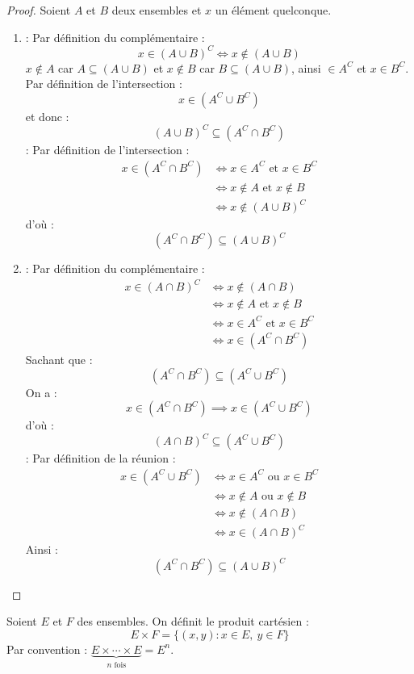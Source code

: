 \begin{proof}
	Soient $A$ et $B$ deux ensembles et $x$ un élément quelconque. 
	\begin{enumerate}
		\item \boxed{\subseteq} : Par définition du complémentaire :
		\[ x \in (A \cup B)^C \iff x \notin (A \cup B) \]
		$x \notin A$ car $A \subseteq (A \cup B)$ et $x \notin B$ car $B \subseteq (A \cup B)$, ainsi $ \in A^C$ et $x \in B^C$. 
		\\
		Par définition de l'intersection :
		\[ x \in (A^C \cup B^C) \]
		et donc :
		\[ (A \cup B)^C \subseteq (A^C \cap B^C) \]
		\boxed{\supseteq} : Par définition de l'intersection :
		\begin{align*}
			x \in (A^C \cap B^C) &\iff x \in A^C \text{ et } x \in B^C \\
			&\iff x \notin A \text{ et } x \notin B \\
			&\iff x \notin (A \cup B)^C
		\end{align*}
		d'où :
		\[ (A^C \cap B^C) \subseteq (A \cup B)^C \]
		\item \boxed{\subseteq} : Par définition du complémentaire :
		\begin{align*}
			x \in (A \cap B)^C &\iff x \notin (A \cap B) \\
			&\iff x \notin A \text{ et } x \notin B \\
			&\iff x \in A^C \text{ et } x \in B^C \\
			&\iff x \in (A^C \cap B^C)
		\end{align*}
		Sachant que :
		\[ (A^C \cap B^C) \subseteq (A^C \cup B^C) \]
		On a :
		\[ x \in (A^C \cap B^C) \implies x \in (A^C \cup B^C) \]
		d'où :
		\[ (A \cap B)^C \subseteq (A^C \cup B^C) \]
		\boxed{\supseteq} : Par définition de la réunion :
		\begin{align*}
			x \in (A^C \cup B^C) &\iff x \in A^C \text{ ou } x \in B^C \\
			&\iff x \notin A \text{ ou } x \notin B \\
			&\iff x \notin (A \cap B) \\
			&\iff x \in (A \cap B)^C
		\end{align*}
		Ainsi : 
		\[ (A^C \cap B^C) \subseteq (A \cup B)^C \]
	\end{enumerate}
\end{proof}

\begin{definition}
    Soient $E$ et $F$ des ensembles. On définit le produit cartésien :
    \[ E \times F = \{ (x, y) : x \in E,\ y \in F \} \]
    Par convention : $\underbrace{E \times \cdots \times E}_{n \text{ fois}} = E^n$.
\end{definition}
